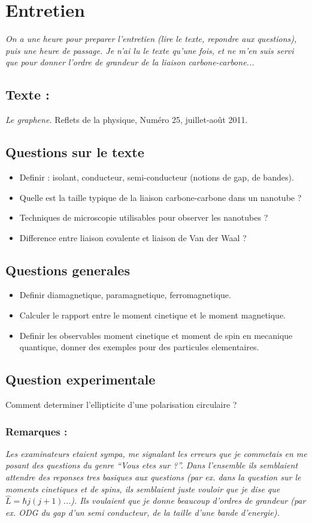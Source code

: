 \documentclass[7pt,a4paper, french]{report}
\begin{document}
\section*{Entretien}

\textit{On a une heure pour preparer l'entretien (lire le texte, repondre aux questions), puis une heure de passage. Je n'ai lu le texte qu'une fois, et ne m'en suis servi que pour donner l'ordre de grandeur de la liaison carbone-carbone... }
\subsection*{Texte :}
\textit{Le graphene.} Reflets de la physique, Numéro 25, juillet-août 2011.
\subsection*{Questions sur le texte}
\begin{itemize}
\item Definir : isolant, conducteur, semi-conducteur (notions de gap, de bandes).
\item Quelle est la taille typique de la liaison carbone-carbone dans un nanotube ?
\item Techniques de microscopie utilisables pour observer les nanotubes ?
\item Difference entre liaison covalente et liaison de Van der Waal ?
\end{itemize}

\subsection*{Questions generales}
\begin{itemize}
\item Definir diamagnetique, paramagnetique, ferromagnetique.
\item Calculer le rapport entre le moment cinetique et le moment magnetique.
\item Definir les observables moment cinetique et moment de spin en mecanique quantique, donner des exemples pour des particules elementaires.
\end{itemize}

\subsection*{Question experimentale}
Comment determiner l'ellipticite d'une polarisation circulaire ?

\subsubsection*{Remarques :} \textit{Les examinateurs etaient sympa, me signalant les erreurs que je commetais en me posant des questions du genre ``Vous etes sur ?''. Dans l'ensemble ils semblaient attendre des reponses tres basiques aux questions (par ex. dans la question sur le moments cinetiques et de spins, ils semblaient juste vouloir que je dise que $\hat{L} = \hbar j(j+1)$...). Ils voulaient que je donne beaucoup d'ordres de grandeur (par ex. ODG du gap d'un semi conducteur, de la taille d'une bande d'energie).}
\end{document}

